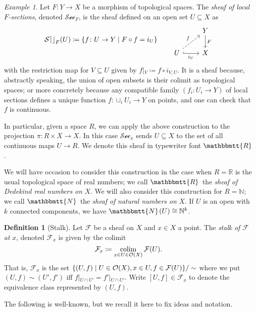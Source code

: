 \documentclass[11pt, oneside, article]{memoir}
\theoremstyle{plain}
\theoremstyle{definition}
\newtheorem{definition}[theorem]{Definition}
\theoremstyle{remark}
\newtheorem{example}[theorem]{Example}
\renewcommand{\ss}{\subseteq}
\DeclareMathOperator*{\colim}{colim}
\newcommand{\fun}[1]{\mathcal{#1}}
\newcommand{\sheaf}[1]{\fun{#1}}
\newcommand{\internal}[1]{\raisebox{-.03ex}{$\mathbbmtt{#1}$}}
\renewcommand{\sec}{\sheaf{Sec}}
\newcommand{\hs}{\hspace{1.1pt}}
\newcommand{\nn}{\mathbb{N}}
\newcommand{\rr}{\mathbb{R}}
\newcommand{\tnn}{\internal{N}\hs}
\newcommand{\trr}{\internal{R}\hs}
\newcommand{\Op}[1][undef]{\ifthenelse{\equal{#1}{undef}}{\mathcal{O}}{\mathcal{O}(#1)}}
\newcommand{\rest}[2]{#1\big|\hspace{0in}_{#2}}
\begin{document}
\begin{example}\label{ex.sections}
Let $F\colon Y\to X$ be a morphism of topological spaces. The \emph{sheaf of local $F$-sections}, denoted $\sec_F$, is the sheaf defined on an open set $U\ss X$ as
\begin{equation}\label{eqn.sections}
\sec_F(U)\coloneqq\{f\colon U\to Y\mid F\circ f=i_U\}
\qquad
\begin{tikzcd}
	&Y\ar[d, "F"]\\
	U\ar[r, hook, "i_U"']\ar[ur, dashed, "f"]&
	X
\end{tikzcd}
\end{equation}
with the restriction map for $V\ss U$ given by $\rest{f}{V}\coloneqq f\circ i_{V,U}$. It is a sheaf because, abstractly speaking, the union of open subsets is their colimit as topological spaces; or more concretely because any compatible family $(f_i\colon U_i\to Y)$ of local sections defines a unique function $f\colon \cup_iU_i\to Y$ on points, and one can check that $f$ is continuous.

In particular, given a space $R$, we can apply the above construction to the projection $\pi\colon R\times X\to X$. In this case $\sec_\pi$ sends $U\ss X$ to the set of all continuous maps $U\to R$. We denote this sheaf in typewriter font $\internal{R}$.

We will have occasion to consider this construction in the case when $R=\rr$ is the usual topological space of real numbers; we call $\trr$ the \emph{sheaf of Dedekind real numbers on $X$}. We will also consider this construction for $R=\nn$; we call $\tnn$ the \emph{sheaf of natural numbers on $X$}. If $U$ is an open with $k$ connected components, we have $\tnn(U)\cong\nn^k$.
\end{example}

\begin{definition}[Stalk]
Let $\sheaf{F}$ be a sheaf on $X$ and $x\in X$ a point. The \emph{stalk of $\sheaf{F}$ at $x$}, denoted $\sheaf{F}_x$ is given by the colimit
\[\sheaf{F}_x\coloneqq\colim_{x\in U\in\Op[X]}\sheaf{F}(U).\]
That is, $\sheaf{F}_x$ is the set $\{(U,f)\mid U\in\Op[X], x\in U, f\in \sheaf{F}(U)\}/\sim$ where we put $(U,f)\sim (U',f')$ iff $\rest{f}{U\cap U'}=\rest{f'}{U\cap U'}$. Write $[U,f]\in \sheaf{F}_x$ to denote the equivalence class represented by $(U,f)$.
\end{definition}

The following is well-known, but we recall it here to fix ideas and notation.
\end{document}
